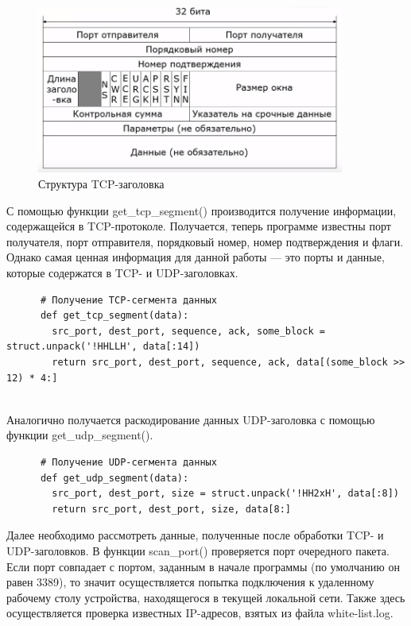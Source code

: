 \documentclass[bachelor, och, coursework]{SCWorks}
\begin{document}
    \begin{figure}[H]
      \centering
      \includegraphics[width=0.9\textwidth]{photo/tcp-segment.jpg}
      \caption{Структура TCP-заголовка}
      \label{tcp-header}
    \end{figure}
    
    С помощью функции get_tcp_segment() производится получение информации, содержащейся в TCP-протоколе. Получается, теперь программе известны порт получателя,
    порт отправителя, порядковый номер, номер подтверждения и флаги. Однако самая ценная информация для данной работы --- это порты и данные, которые
    содержатся в TCP- и UDP-заголовках.

    \begin{verbatim}
      # Получение TCP-cегмента данных
      def get_tcp_segment(data):
        src_port, dest_port, sequence, ack, some_block = struct.unpack('!HHLLH', data[:14])
        return src_port, dest_port, sequence, ack, data[(some_block >> 12) * 4:]
    
    \end{verbatim}

    Аналогично получается раскодирование данных UDP-заголовка с помощью функции get_udp_segment().

    \begin{verbatim}
      # Получение UDP-сегмента данных
      def get_udp_segment(data):
        src_port, dest_port, size = struct.unpack('!HH2xH', data[:8])
        return src_port, dest_port, size, data[8:]
    \end{verbatim}      

    Далее необходимо рассмотреть данные, полученные после обработки TCP- и UDP-заголовков. В функции scan_port() проверяется порт очередного пакета.
    Если порт совпадает с портом, заданным в начале программы (по умолчанию он равен 3389), то значит осуществляется попытка подключения к удаленному рабочему
    столу устройства, находящегося в текущей локальной сети. Также здесь осуществляется проверка известных IP-адресов, взятых из файла white-list.log. 
\end{document}

